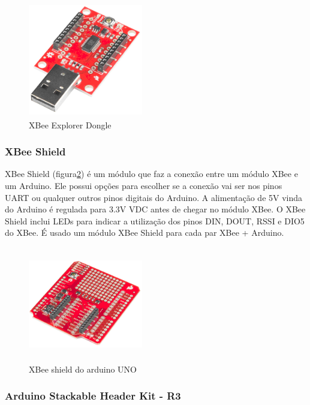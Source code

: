 \begin{figure}[H]
\begin{center}
\includegraphics[width=5cm,height=5cm,keepaspectratio]{figuras/xbee_explorer_dongle.png}
\caption{\label{fig:xbee explorer dongle} XBee Explorer Dongle}
\end{center}
\end{figure}

\subsubsection{XBee Shield}

XBee Shield (figura\ref{fig:xbee shield}) é um módulo que faz a conexão entre um módulo XBee e um Arduino. Ele possui opções para escolher se a conexão vai ser nos pinos UART ou qualquer outros pinos digitais do Arduino. A alimentação de 5V vinda do Arduino é regulada para 3.3V VDC antes de chegar no módulo XBee. O XBee Shield inclui LEDs para indicar a utilização dos pinos DIN, DOUT, RSSI e DIO5 do XBee. É usado um módulo XBee Shield para cada par XBee + Arduino.

\begin{figure}[H]
\begin{center}
\includegraphics[width=5cm,height=5cm,keepaspectratio]{figuras/xbee_shield.png}
\caption{\label{fig:xbee shield} XBee shield do arduino UNO}
\end{center}
\end{figure}

\subsubsection{Arduino Stackable Header Kit - R3}

